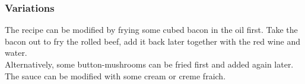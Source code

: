 \subsubsection{Variations}
The recipe can be modified by frying some cubed bacon in the oil first. Take the bacon out to fry the rolled beef, add it back later together with the red wine and water.\\
Alternatively, some button-mushrooms can be fried first and added again later.\\
The sauce can be modified with some cream or creme fraich.

\vfill
